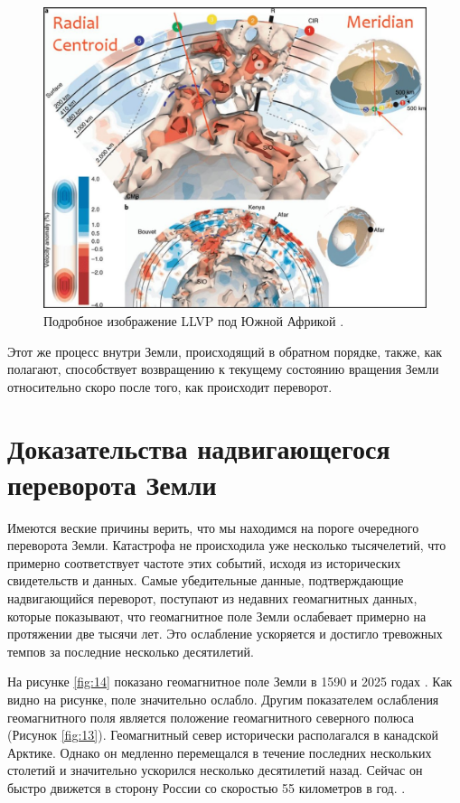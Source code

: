 \documentclass[10pt,twocolumn,letterpaper]{article}
\begin{document}
\begin{figure}[t]
\begin{center}
   \includegraphics[width=1\linewidth]{llvp.jpg}
\end{center}
   \caption{Подробное изображение LLVP под Южной Африкой \cite{28}.}
\label{fig:12}
\label{fig:onecol}
\end{figure}

Этот же процесс внутри Земли, происходящий в обратном порядке, также, как полагают, способствует возвращению к текущему состоянию вращения Земли относительно скоро после того, как происходит переворот.

\section{Доказательства надвигающегося переворота Земли}

Имеются веские причины верить, что мы находимся на пороге очередного переворота Земли. Катастрофа не происходила уже несколько тысячелетий, что примерно соответствует частоте этих событий, исходя из исторических свидетельств и данных. Самые убедительные данные, подтверждающие надвигающийся переворот, поступают из недавних геомагнитных данных, которые показывают, что геомагнитное поле Земли ослабевает примерно на протяжении две тысячи лет. Это ослабление ускоряется и достигло тревожных темпов за последние несколько десятилетий.

На рисунке \ref{fig:14} показано геомагнитное поле Земли в 1590 и 2025 годах \cite{125,126}. Как видно на рисунке, поле значительно ослабло.
Другим показателем ослабления геомагнитного поля является положение геомагнитного северного полюса (Рисунок \ref{fig:13}). Геомагнитный север исторически располагался в канадской Арктике. Однако он медленно перемещался в течение последних нескольких столетий и значительно ускорился несколько десятилетий назад. Сейчас он быстро движется в сторону России со скоростью 55 километров в год. \cite{124}.
\end{document}
